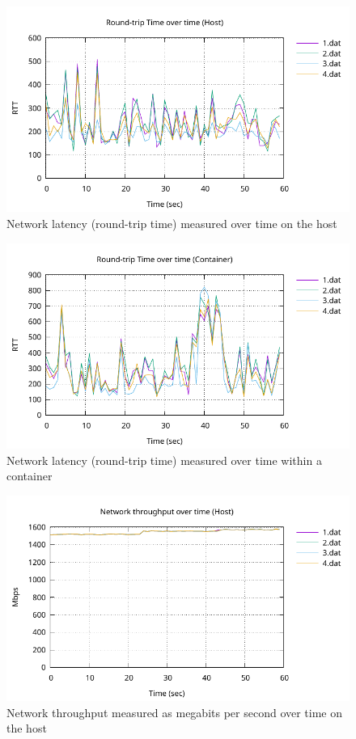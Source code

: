 \begin{figure}[H]
    \centering
    \includegraphics[width=1\textwidth]{images/results/network-host-rtt.pdf}
    \caption{Network latency (round-trip time) measured over time on the host}
    \label{ticket-builder-class}
\end{figure}

\begin{figure}[H]
    \centering
    \includegraphics[width=1\textwidth]{images/results/network-rtt-container.pdf}
    \caption{Network latency (round-trip time) measured over time within a container}
    \label{ticket-builder-class}
\end{figure}

\begin{figure}[H]
    \centering
    \includegraphics[width=1\textwidth]{images/results/network-host-throughput.pdf}
    \caption{Network throughput measured as megabits per second over time on the host}
    \label{ticket-builder-class}
\end{figure}

